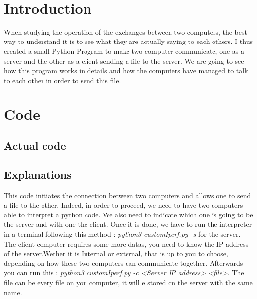 \documentclass[a4paper]{article}
\title{\underline{\textbf{\begin{Huge}Network\end{Huge}}}\\\vspace{1cm}
    \begin{huge}
        \textbf{Client / Server communication study}
    \end{huge}\\}
\author{
        Tom Moulard (16920041)
        \date{}
        }
\begin{document}
\maketitle
\begin{center}
\vspace{1cm}
\date{2017 June 15}
\vspace{2cm}\\
\end{center}    
    \thispagestyle{empty}

\newpage{}

\tableofcontents
\thispagestyle{empty}

\newpage
\section{Introduction}

When studying the operation of the exchanges between two computers, the best way to understand it is to see what they are actually saying to each others.
I thus created a small Python Program to make two computer communicate, one as a server and the other as a client sending a file to the server.
We are going to see how this program works in details and how the computers have managed to talk to each other in order to send this file.  

\section{Code}

\subsection{Actual code}


\subsection{Explanations}

This code initiates the connection between two computers and allows one to send a file to the other.
Indeed, in order to proceed, we need to have two computers able to interpret a python code.
We also need to indicate which one is going to be the server and with one the client.
Once it is done, we have to run the interpreter in a terminal following this method : \textit{python3 customIperf.py -s} for the server.\\
The client computer requires some more datas, you need to know the IP address of the server.Wether it is Internal or external, that is up to you to choose, depending on how these two computers can communicate together. Afterwards you can run this : \textit{python3 customIperf.py -c <Server IP address> <file>}. The file can be every file on you computer, it will e stored on the server with the same name.
\end{document}
